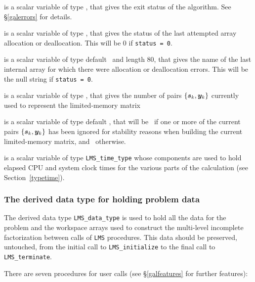 \documentclass{galahad}
\newcommand{\packagename}{LMS}
\begin{document}
\begin{description}

 is a scalar variable of type \integer, that gives the
exit status of the algorithm.
See \S\ref{galerrors}
for details.

 is a scalar variable of type \integer, that gives
the status of the last attempted array allocation or deallocation.
This will be 0 if {\tt status = 0}.

 is a scalar variable of type default \character\
and length 80, that  gives the name of the last internal array
for which there were allocation or deallocation errors.
This will be the null string if {\tt status = 0}.

 is a scalar variable of type \integer, that
gives the number of pairs $\{{\bm{s}}_k,{\bm{y}}_k\}$ currently used to represent the
limited-memory matrix

 is a scalar variable of type default \logical, that
will be \true\ if one or more of the current pairs $\{{\bm{s}}_k,{\bm{y}}_k\}$ has
been ignored for stability reasons when building the current limited-memory
matrix, and \false\ otherwise.

 is a scalar variable of type {\tt \packagename\_time\_type}
whose components are used to hold elapsed CPU and system clock times for
the various parts of the calculation (see Section~\ref{typetime}).

\end{description}


\subsubsection{The derived data type for holding problem data}\label{typedata}
The derived data type
{\tt \packagename\_data\_type}
is used to hold all the data for the problem and the workspace arrays
used to construct the multi-level incomplete factorization between calls of
{\tt \packagename} procedures.
This data should be preserved, untouched, from the initial call to
{\tt \packagename\_initialize}
to the final call to
{\tt \packagename\_terminate}.


\galarguments
There are seven procedures for user calls
(see \S\ref{galfeatures} for further features):
\end{document}
